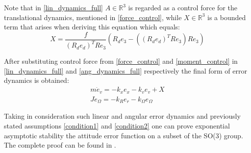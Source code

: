 \noindent Note that in \ref{lin_dynamics_full} $A\in \mathbb{R}^3$ is regarded as a control force for the translational dynamics, mentioned in \ref{force_control}, while $X\in\mathbb{R}^3$ is a bounded term that arises when deriving this equation which equals:
\begin{equation}
	X = \frac{f}{(R_de_d)^TRe_3}(R_d e_3 - ((R_de_d)^TRe_3)Re_3)
\end{equation}

\noindent After substituting control force from \ref{force_control} and \ref{moment_control} in \ref{lin_dynamics_full} and \ref{ang_dynamics_full} respectively the final form of error dynamics is obtained:
\begin{gather}
	m\dot{e}_v = -k_x e_x - k_v e_v + X \\
	J\dot{e}_\Omega = -k_R e_r - k_\Omega e_\Omega
\end{gather}

Taking in consideration such linear and angular error dynamics and previously stated assumptions \ref{condition1} and \ref{condition2} one can prove exponential asymptotic stability the attitude error function on a subset of the SO(3) group. The complete proof can be found in \cite{LeeClanak1}.


